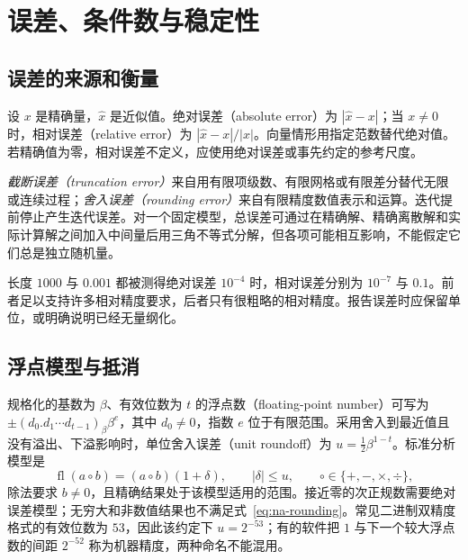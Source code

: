 \setcounter{chapter}{1} %
\chapter{误差、条件数与稳定性}
\label{chap:na-errors}

\section{误差的来源和衡量}
\begin{definition}[绝对误差与相对误差]
设 $x$ 是精确量，$\widehat x$ 是近似值。绝对误差（absolute error）为 $|\widehat x-x|$；当 $x\ne0$ 时，相对误差（relative error）为 $|\widehat x-x|/|x|$。向量情形用指定范数替代绝对值。若精确值为零，相对误差不定义，应使用绝对误差或事先约定的参考尺度。
\end{definition}

\emph{截断误差（truncation error）}来自用有限项级数、有限网格或有限差分替代无限或连续过程；\emph{舍入误差（rounding error）}来自有限精度数值表示和运算。迭代提前停止产生迭代误差。对一个固定模型，总误差可通过在精确解、精确离散解和实际计算解之间加入中间量后用三角不等式分解，但各项可能相互影响，不能假定它们总是独立随机量。

\begin{example}[相同绝对误差的不同含义]
长度 $1000$ 与 $0.001$ 都被测得绝对误差 $10^{-4}$ 时，相对误差分别为 $10^{-7}$ 与 $0.1$。前者足以支持许多相对精度要求，后者只有很粗略的相对精度。报告误差时应保留单位，或明确说明已经无量纲化。
\end{example}

\section{浮点模型与抵消}
\label{sec:na-floating}
规格化的基数为 $\beta$、有效位数为 $t$ 的浮点数（floating-point number）可写为 $\pm(d_0.d_1\cdots d_{t-1})_\beta\beta^e$，其中 $d_0\ne0$，指数 $e$ 位于有限范围。采用舍入到最近值且没有溢出、下溢影响时，单位舍入误差（unit roundoff）为 $u=\tfrac12\beta^{1-t}$。标准分析模型是
\begin{equation}
 \operatorname{fl}(a\circ b)=(a\circ b)(1+\delta),
 \qquad |\delta|\le u,\qquad \circ\in\{+,-,\times,\div\},
 \label{eq:na-rounding}
\end{equation}
除法要求 $b\ne0$，且精确结果处于该模型适用的范围。接近零的次正规数需要绝对误差模型；无穷大和非数值结果也不满足式~\eqref{eq:na-rounding}。常见二进制双精度格式的有效位数为 $53$，因此该约定下 $u=2^{-53}$；有的软件把 $1$ 与下一个较大浮点数的间距 $2^{-52}$ 称为机器精度，两种命名不能混用。

